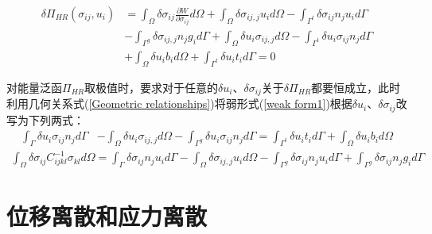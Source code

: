 \begin{equation}\label{weak form1}
\begin{split} 
    \delta\Pi_{H\!R}(\sigma_{ij},u_i)&=\int_{\Omega}\delta\sigma_{ij}\frac{\partial W}{\partial \sigma_{ij}}d\Omega+\int_{\Omega}\delta\sigma_{ij,j}u_id\Omega-\int_{\Gamma^t}\delta\sigma_{ij}n_ju_id\Gamma\\
    &-\int_{\Gamma^g}\delta\sigma_{ij,j}n_jg_id\Gamma+\int_{\Omega}\delta u_i\sigma_{ij,j}d\Omega- \int_{\Gamma^t}\delta u_i\sigma_{ij}n_jd\Gamma\\
    &+\int_{\Omega}\delta u_ib_id\Omega+\int_{\Gamma^t}\delta u_it_id\Gamma=0
\end{split}
\end{equation}\par
对能量泛函$\Pi_{H\!R}$取极值时，要求对于任意的$\delta u_i$、$\delta\sigma_{ij}$关于$\delta\Pi_{H\!R}$都要恒成立，此时利用几何关系式(\ref{Geometric relationships})将弱形式(\ref{weak form1})根据$\delta u_i$、$\delta\sigma_{ij}$改写为下列两式：
\begin{equation}\label{deltau}
\begin{split}
    \int_{\Gamma}\delta u_i\sigma_{ij}n_jd\Gamma&-\int_{\Omega}\delta u_i\sigma_{ij,j}d\Omega-\int_{\Gamma^g}\delta u_i\sigma_{ij}n_jd\Gamma
    =\int_{\Gamma^t}\delta u_it_id\Gamma+\int_{\Omega}\delta u_ib_id\Omega
\end{split}
\end{equation} 
\begin{equation}\label{deltasigma}
\begin{split}
    \int_{\Omega}\delta\sigma_{ij}C^{-1}_{ijkl}\sigma_{kl}d\Omega=\int_{\Gamma}\delta\sigma_{ij}n_ju_id\Gamma-\int_{\Omega}\delta\sigma_{ij,j}u_id\Omega
    -\int_{\Gamma^g}\delta\sigma_{ij}n_ju_id\Gamma+\int_{\Gamma^g}\delta\sigma_{ij}n_jg_id\Gamma
\end{split}
\end{equation}    
\section{位移离散和应力离散}
